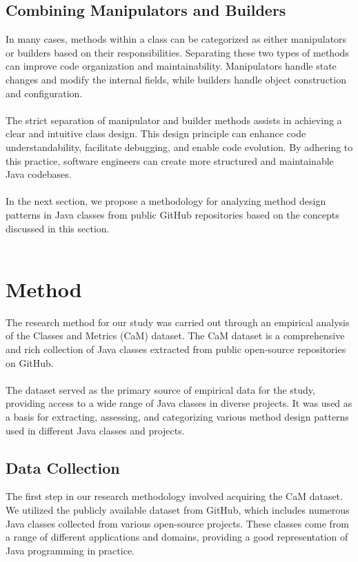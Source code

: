 \documentclass[draft]{article}
\begin{document}
\subsection{Combining Manipulators and Builders}
In many cases, methods within a class can be categorized as either manipulators or builders based on their responsibilities. Separating these two types of methods can improve code organization and maintainability. Manipulators handle state changes and modify the internal fields, while builders handle object construction and configuration.\\
~\\
The strict separation of manipulator and builder methods assists in achieving a clear and intuitive class design. This design principle can enhance code understandability, facilitate debugging, and enable code evolution. By adhering to this practice, software engineers can create more structured and maintainable Java codebases.\\
~\\
In the next section, we propose a methodology for analyzing method design patterns in Java classes from public GitHub repositories based on the concepts discussed in this section.\\
~\\

\newpage
\section{Method}
The research method for our study was carried out through an empirical analysis of the Classes and Metrics (CaM) dataset\cite{ref9}. The CaM dataset is a comprehensive and rich collection of Java classes extracted from public open-source repositories on GitHub.\\
~\\
The dataset served as the primary source of empirical data for the study, providing access to a wide range of Java classes in diverse projects. It was used as a basis for extracting, assessing, and categorizing various method design patterns used in different Java classes and projects.
\subsection{Data Collection}
The first step in our research methodology involved acquiring the CaM dataset. We utilized the publicly available dataset from GitHub, which includes numerous Java classes collected from various open-source projects. These classes come from a range of different applications and domains, providing a good representation of Java programming in practice.
\end{document}
